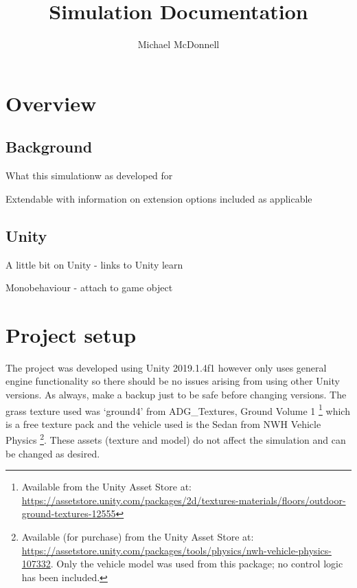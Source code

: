 \documentclass{article}
\begin{document}
\title{Simulation Documentation}
\author{Michael McDonnell}

\maketitle

\tableofcontents
\newpage

\section*{Overview}

\subsection*{Background}

What this simulationw as developed for

Extendable with information on extension options included as applicable

\subsection*{Unity}
A little bit on Unity - links to Unity learn

Monobehaviour - attach to game object
\section{Project setup}

The project was developed using Unity 2019.1.4f1 however only uses general engine functionality so there should be no issues arising from using other Unity versions. As always, make a backup just to be safe before changing versions. The grass texture used was `ground4' from ADG\_Textures, Ground Volume 1 \footnote{Available from the Unity Asset Store at:  \url{https://assetstore.unity.com/packages/2d/textures-materials/floors/outdoor-ground-textures-12555} } which is a free texture pack and the vehicle used is the Sedan from NWH Vehicle Physics \footnote{Available (for purchase) from the Unity Asset Store at: \url{https://assetstore.unity.com/packages/tools/physics/nwh-vehicle-physics-107332}. Only the vehicle model was used from this package; no control logic has been included. }. These assets (texture and model) do not affect the simulation and can be changed as desired.
\end{document}
